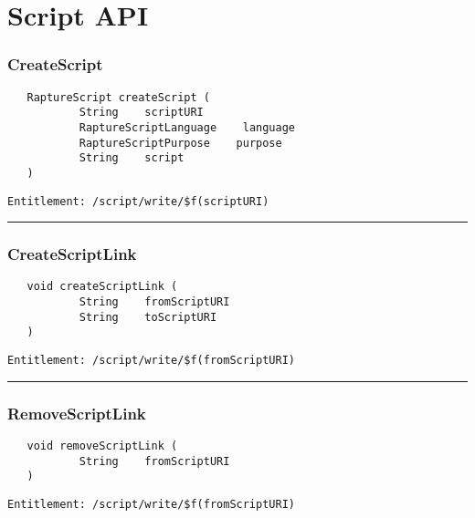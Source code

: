 \chapter{Script API}

\subsection{CreateScript}
\label{Api:CreateScript}
\begin{verbatim}
   RaptureScript createScript (
           String    scriptURI
           RaptureScriptLanguage    language
           RaptureScriptPurpose    purpose
           String    script
   )
\end{verbatim}
\begin{Verbatim}[fontsize=\small, formatcom=\color{Maroon}]
  Entitlement: /script/write/$f(scriptURI)
\end{Verbatim}



\rule{12cm}{2pt}
\subsection{CreateScriptLink}
\label{Api:CreateScriptLink}
\begin{verbatim}
   void createScriptLink (
           String    fromScriptURI
           String    toScriptURI
   )
\end{verbatim}
\begin{Verbatim}[fontsize=\small, formatcom=\color{Maroon}]
  Entitlement: /script/write/$f(fromScriptURI)
\end{Verbatim}



\rule{12cm}{2pt}
\subsection{RemoveScriptLink}
\label{Api:RemoveScriptLink}
\begin{verbatim}
   void removeScriptLink (
           String    fromScriptURI
   )
\end{verbatim}
\begin{Verbatim}[fontsize=\small, formatcom=\color{Maroon}]
  Entitlement: /script/write/$f(fromScriptURI)
\end{Verbatim}



